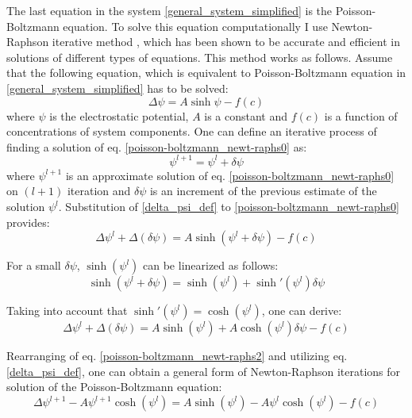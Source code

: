The last equation in the system \eqref{general_system_simplified} is the Poisson-Boltzmann equation. To solve this equation computationally I use Newton-Raphson iterative method \cite{Carnie1994,Harries1998}, which has been shown to be accurate and efficient in solutions of different types of equations. This method works as follows. Assume that the following equation, which is equivalent to Poisson-Boltzmann equation in \eqref{general_system_simplified} has to be solved:
\begin{equation}
 \label{poisson-boltzmann_newt-raphs0}\Delta\psi = A \sinh{\psi} - f(c)
\end{equation}
where $\psi$ is the electrostatic potential, $A$ is a constant and $f(c)$ is a function of concentrations of system components. One can define an iterative process of finding a solution of eq. \eqref{poisson-boltzmann_newt-raphs0} as:
\begin{equation}
 \label{delta_psi_def}\psi^{l+1} = \psi^l + \delta \psi
\end{equation}
where $\psi^{l+1}$ is an approximate solution of eq. \eqref{poisson-boltzmann_newt-raphs0} on $(l+1)$ iteration and $\delta \psi$ is an increment of the previous estimate of the solution $\psi^l$. Substitution of \eqref{delta_psi_def} to \eqref{poisson-boltzmann_newt-raphs0} provides:
\begin{equation}
 \label{poisson-boltzmann_newt-raphs1}\Delta\psi^l + \Delta(\delta\psi) = A \sinh{(\psi^l+\delta\psi)} - f(c)
\end{equation}

For a small $\delta\psi$, $\sinh(\psi^l)$ can be linearized as follows:
\begin{equation}
 \sinh(\psi^l+\delta\psi) = \sinh(\psi^l) + \sinh'(\psi^l)\delta\psi
\end{equation}

Taking into account that $\sinh'(\psi^l) = \cosh(\psi^l)$, one can derive:
\begin{equation}
 \label{poisson-boltzmann_newt-raphs2}\Delta\psi^l + \Delta(\delta\psi) = A\sinh(\psi^l) + A\cosh(\psi^l)\delta\psi - f(c)
\end{equation}

Rearranging of eq. \eqref{poisson-boltzmann_newt-raphs2} and utilizing eq. \eqref{delta_psi_def}, one can obtain a general form of Newton-Raphson iterations for solution of the Poisson-Boltzmann equation:
\begin{equation}
 \label{poisson-boltzmann_newt-raphs3}\Delta\psi^{l+1} - A\psi^{l+1}\cosh(\psi^l)  = A\sinh(\psi^l) - A\psi^l\cosh(\psi^l) - f(c)
\end{equation}

